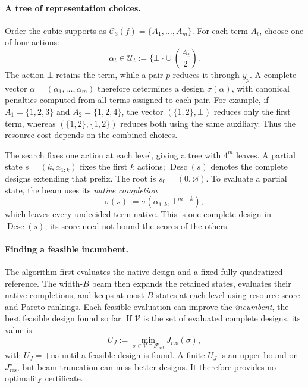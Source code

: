\documentclass[a4paper,onecolumn,11pt,unpublished]{quantumarticle}
\theoremstyle{remark}
\begin{document}
\paragraph{A tree of representation choices.}
Order the cubic supports as \(\mathcal C_3(f)=\{A_1,\ldots,A_m\}\).
For each term \(A_t\), choose one of four actions:
\[
\alpha_t\in\mathcal U_t:=\{\bot\}\cup\binom{A_t}{2}.
\]
The action \(\bot\) retains the term, while a pair \(p\) reduces it through
\(y_p\).  A complete vector \(\alpha=(\alpha_1,\ldots,\alpha_m)\) therefore
determines a design \(\sigma(\alpha)\), with canonical penalties computed
from all terms assigned to each pair.  For example, if
\(A_1=\{1,2,3\}\) and \(A_2=\{1,2,4\}\), the vector
\((\{1,2\},\bot)\) reduces only the first term, whereas
\((\{1,2\},\{1,2\})\) reduces both using the same auxiliary.
Thus the resource cost depends on the combined choices.

The search fixes one action at each level, giving a tree with \(4^m\)
leaves.  A partial state \(s=(k,\alpha_{1:k})\) fixes the first \(k\)
actions; \(\operatorname{Desc}(s)\) denotes the complete designs extending
that prefix.  The root is \(s_0=(0,\varnothing)\).  To evaluate a partial
state, the beam uses its \emph{native completion}
\[
\bar\sigma(s):=\sigma(\alpha_{1:k},\bot^{m-k}),
\]
which leaves every undecided term native.  This is one complete design in
\(\operatorname{Desc}(s)\); its score need not bound the scores of the others.

\paragraph{Finding a feasible incumbent.}
The algorithm first evaluates the native design and a fixed fully
quadratized reference.  The width-\(B\) beam then expands the retained states,
evaluates their native completions, and keeps at most \(B\) states at each
level using resource-score and Pareto rankings.  Each feasible evaluation
can improve the \emph{incumbent}, the best feasible design found so far.
If \(\mathcal V\) is the set of evaluated complete designs, its value is
\[
U_J:=\min_{\sigma\in\mathcal V\cap\mathcal F_{\mathrm{sel}}}J_{\mathrm{res}}(\sigma),
\]
with \(U_J=+\infty\) until a feasible design is found.  A finite \(U_J\)
is an upper bound on \(J_{\mathrm{res}}^\star\), but beam truncation can
miss better designs.  It therefore provides no optimality certificate.
\end{document}
